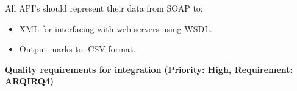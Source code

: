 \documentclass[12pt]{article}
\begin{document}
			\vspace{0.05in} 
		
		All API's should represent their data from SOAP to:
		\begin{itemize}
			\item XML for interfacing with web servers using WSDL.
			\item Output marks to .CSV format.
		\end{itemize}
	
	\vspace{0.15in}

	\begin{flushleft}
		\textbf{Quality requirements for integration}
		\newline\textbf{(Priority: High, Requirement: ARQIRQ4)}
	\end{flushleft}

		
	\vspace{0.05in}
			
\end{document}
